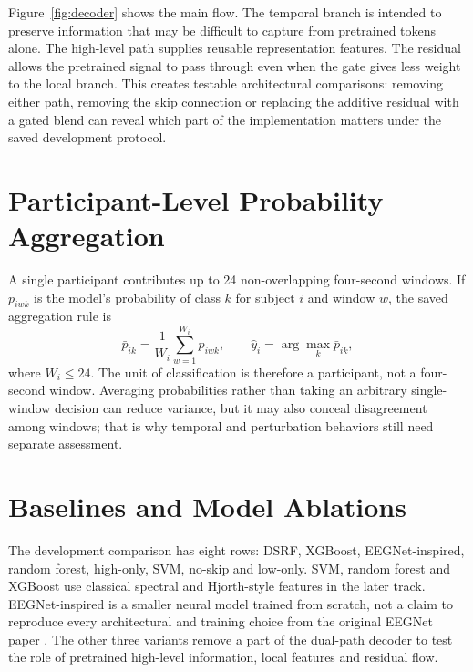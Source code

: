 
Figure~\ref{fig:decoder} shows the main flow. The temporal branch is intended to preserve information that may be difficult to capture from pretrained tokens alone. The high-level path supplies reusable representation features. The residual allows the pretrained signal to pass through even when the gate gives less weight to the local branch. This creates testable architectural comparisons: removing either path, removing the skip connection or replacing the additive residual with a gated blend can reveal which part of the implementation matters under the saved development protocol.

\section{Participant-Level Probability Aggregation}
A single participant contributes up to 24 non-overlapping four-second windows. If $p_{iwk}$ is the model's probability of class $k$ for subject $i$ and window $w$, the saved aggregation rule is
\begin{equation}
\bar p_{ik}=\frac{1}{W_i}\sum_{w=1}^{W_i}p_{iwk},\qquad
\hat y_i=\arg\max_k\bar p_{ik},
\label{eq:aggregate}
\end{equation}
where $W_i\leq24$. The unit of classification is therefore a participant, not a four-second window. Averaging probabilities rather than taking an arbitrary single-window decision can reduce variance, but it may also conceal disagreement among windows; that is why temporal and perturbation behaviors still need separate assessment.

\section{Baselines and Model Ablations}
The development comparison has eight rows: DSRF, XGBoost, EEGNet-inspired, random forest, high-only, SVM, no-skip and low-only. SVM, random forest and XGBoost use classical spectral and Hjorth-style features in the later track. EEGNet-inspired is a smaller neural model trained from scratch, not a claim to reproduce every architectural and training choice from the original EEGNet paper \cite{lawhern2018}. The other three variants remove a part of the dual-path decoder to test the role of pretrained high-level information, local features and residual flow.

